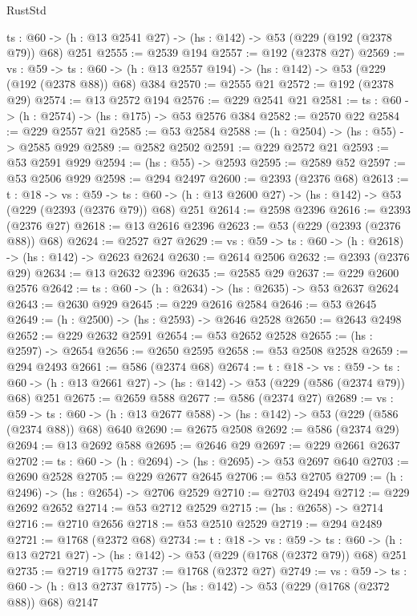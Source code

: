 \begin{lexlean}{RustStd}
\begin{coremodule}
  {ts : @60} -> (h : @13 @2541 @27) -> (hs : @142) -> @53 (@229 (@192 (@2378 @79)) @68) @251
@2555 := @2539 @194
@2557 := @192 (@2378 @27)
@2569 := {vs : @59} ->
  {ts : @60} -> (h : @13 @2557 @194) -> (hs : @142) -> @53 (@229 (@192 (@2378 @88)) @68) @384
@2570 := @2555 @21
@2572 := @192 (@2378 @29)
@2574 := @13 @2572 @194
@2576 := @229 @2541 @21
@2581 := {ts : @60} -> (h : @2574) -> (hs : @175) -> @53 @2576 @384
@2582 := @2570 @22
@2584 := @229 @2557 @21
@2585 := @53 @2584
@2588 := (h : @2504) -> (hs : @55) -> @2585 @929
@2589 := @2582 @2502
@2591 := @229 @2572 @21
@2593 := @53 @2591 @929
@2594 := (hs : @55) -> @2593
@2595 := @2589 @52
@2597 := @53 @2506 @929
@2598 := @294 @2497
@2600 := @2393 (@2376 @68)
@2613 := {t : @18} ->
  {vs : @59} ->
  {ts : @60} -> (h : @13 @2600 @27) -> (hs : @142) -> @53 (@229 (@2393 (@2376 @79)) @68) @251
@2614 := @2598 @2396
@2616 := @2393 (@2376 @27)
@2618 := @13 @2616 @2396
@2623 := @53 (@229 (@2393 (@2376 @88)) @68)
@2624 := @2527 @27
@2629 := {vs : @59} -> {ts : @60} -> (h : @2618) -> (hs : @142) -> @2623 @2624
@2630 := @2614 @2506
@2632 := @2393 (@2376 @29)
@2634 := @13 @2632 @2396
@2635 := @2585 @29
@2637 := @229 @2600 @2576
@2642 := {ts : @60} -> (h : @2634) -> (hs : @2635) -> @53 @2637 @2624
@2643 := @2630 @929
@2645 := @229 @2616 @2584
@2646 := @53 @2645
@2649 := (h : @2500) -> (hs : @2593) -> @2646 @2528
@2650 := @2643 @2498
@2652 := @229 @2632 @2591
@2654 := @53 @2652 @2528
@2655 := (hs : @2597) -> @2654
@2656 := @2650 @2595
@2658 := @53 @2508 @2528
@2659 := @294 @2493
@2661 := @586 (@2374 @68)
@2674 := {t : @18} ->
  {vs : @59} ->
  {ts : @60} -> (h : @13 @2661 @27) -> (hs : @142) -> @53 (@229 (@586 (@2374 @79)) @68) @251
@2675 := @2659 @588
@2677 := @586 (@2374 @27)
@2689 := {vs : @59} ->
  {ts : @60} -> (h : @13 @2677 @588) -> (hs : @142) -> @53 (@229 (@586 (@2374 @88)) @68) @640
@2690 := @2675 @2508
@2692 := @586 (@2374 @29)
@2694 := @13 @2692 @588
@2695 := @2646 @29
@2697 := @229 @2661 @2637
@2702 := {ts : @60} -> (h : @2694) -> (hs : @2695) -> @53 @2697 @640
@2703 := @2690 @2528
@2705 := @229 @2677 @2645
@2706 := @53 @2705
@2709 := (h : @2496) -> (hs : @2654) -> @2706 @2529
@2710 := @2703 @2494
@2712 := @229 @2692 @2652
@2714 := @53 @2712 @2529
@2715 := (hs : @2658) -> @2714
@2716 := @2710 @2656
@2718 := @53 @2510 @2529
@2719 := @294 @2489
@2721 := @1768 (@2372 @68)
@2734 := {t : @18} ->
  {vs : @59} ->
  {ts : @60} -> (h : @13 @2721 @27) -> (hs : @142) -> @53 (@229 (@1768 (@2372 @79)) @68) @251
@2735 := @2719 @1775
@2737 := @1768 (@2372 @27)
@2749 := {vs : @59} ->
  {ts : @60} -> (h : @13 @2737 @1775) -> (hs : @142) -> @53 (@229 (@1768 (@2372 @88)) @68) @2147

\end{coremodule}
\end{lexlean}
